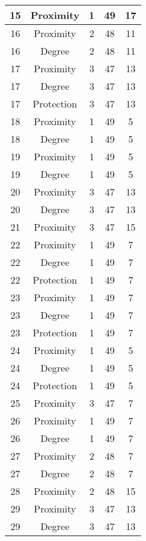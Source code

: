 \documentclass[results.tex]{subfiles}
\begin{document}
\begin{center}
\begin{tabular}{| c || c | c | c | c |}
    \hline
    15 & Proximity & 1 & 49 & 17 \\ 
    \hline
    16 & Proximity & 2 & 48 & 11 \\ 
    \hline
    16 & Degree & 2 & 48 & 11 \\ 
    \hline
    17 & Proximity & 3 & 47 & 13 \\ 
    \hline
    17 & Degree & 3 & 47 & 13 \\ 
    \hline
    17 & Protection & 3 & 47 & 13 \\ 
    \hline
    18 & Proximity & 1 & 49 & 5 \\ 
    \hline
    18 & Degree & 1 & 49 & 5 \\ 
    \hline
    19 & Proximity & 1 & 49 & 5 \\ 
    \hline
    19 & Degree & 1 & 49 & 5 \\ 
    \hline
    20 & Proximity & 3 & 47 & 13 \\ 
    \hline
    20 & Degree & 3 & 47 & 13 \\ 
    \hline
    21 & Proximity & 3 & 47 & 15 \\ 
    \hline
    22 & Proximity & 1 & 49 & 7 \\ 
    \hline
    22 & Degree & 1 & 49 & 7 \\ 
    \hline
    22 & Protection & 1 & 49 & 7 \\ 
    \hline
    23 & Proximity & 1 & 49 & 7 \\ 
    \hline
    23 & Degree & 1 & 49 & 7 \\ 
    \hline
    23 & Protection & 1 & 49 & 7 \\ 
    \hline
    24 & Proximity & 1 & 49 & 5 \\ 
    \hline
    24 & Degree & 1 & 49 & 5 \\ 
    \hline
    24 & Protection & 1 & 49 & 5 \\ 
    \hline
    25 & Proximity & 3 & 47 & 7 \\ 
    \hline
    26 & Proximity & 1 & 49 & 7 \\ 
    \hline
    26 & Degree & 1 & 49 & 7 \\ 
    \hline
    27 & Proximity & 2 & 48 & 7 \\ 
    \hline
    27 & Degree & 2 & 48 & 7 \\ 
    \hline
    28 & Proximity & 2 & 48 & 15 \\ 
    \hline
    29 & Proximity & 3 & 47 & 13 \\ 
    \hline
    29 & Degree & 3 & 47 & 13 \\ 
    \hline

\end{tabular}
\end{center}
\end{document}
